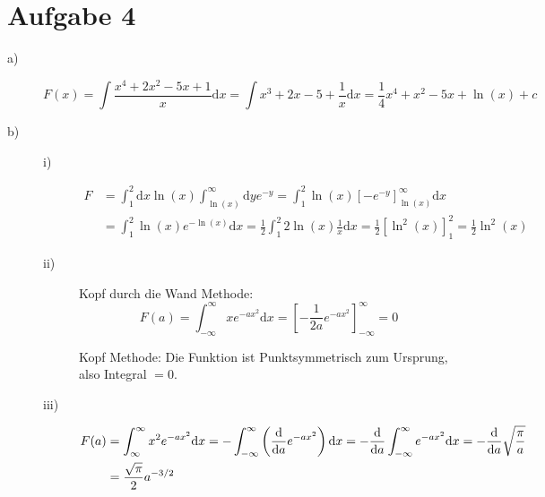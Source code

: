 \section*{Aufgabe 4}
\begin{description}
	\item[a)] 
	\[
		F(x) = \int \frac{x^4 + 2x^2 - 5x + 1}{x} \mathrm{d}x
		= \int x^3 + 2x - 5 + \frac{1}{x} \mathrm{d}x
		= \frac{1}{4} x^4 + x^2 - 5x + \ln(x) + c	
	\]
	\item[b)]
	\begin{description}
		\item[i)] 
		\begin{align*}
			F 
			&= \int^2_1 \mathrm{d} x \ln(x) \int^\infty_{\ln(x)} \mathrm{d} y e^{-y}
			= \int^2_1 \ln(x) \left[ - e^{-y} \right]^\infty_{\ln(x)} \mathrm{d} x \\
			&= \int^2_1 \ln(x) e^{-\ln(x)} \mathrm{d} x
			= \frac{1}{2} \int^2_1 2 \ln(x) \frac{1}{x} \mathrm{d} x
			= \frac{1}{2} \left[ \ln^2(x) \right]^2_1
			= \frac{1}{2} \ln^2(x)
		\end{align*}
		
		\item[ii)] Kopf durch die Wand Methode:
		\[
			F(a) = \int^\infty_{-\infty} x e^{-ax^2} \mathrm{d} x 
			= \left[ -\frac{1}{2a} e^{-ax^2} \right]^\infty_{-\infty}
			= 0
		\]
		
		Kopf Methode: Die Funktion ist Punktsymmetrisch zum Ursprung, also Integral $=0$.
		
		\item[iii)] 
		\begin{align*}
			F(a) &= \int^\infty_{\infty} x^2 e^{-ax^2} \mathrm{d} x 
			= - \int^\infty_{-\infty} \left( \frac{\mathrm{d}}{\mathrm{d}a} e^{-ax^2} \right) \mathrm{d} x
			= -\frac{\mathrm{d}}{\mathrm{d}a} \int^\infty_{-\infty} e^{-ax^2} \mathrm{d} x
			= -\frac{\mathrm{d}}{\mathrm{d}a} \sqrt{\frac{\pi}{a}} \\
			&= \frac{\sqrt{\pi}}{2} a^{-3/2}
		\end{align*}
	\end{description}
\end{description}

